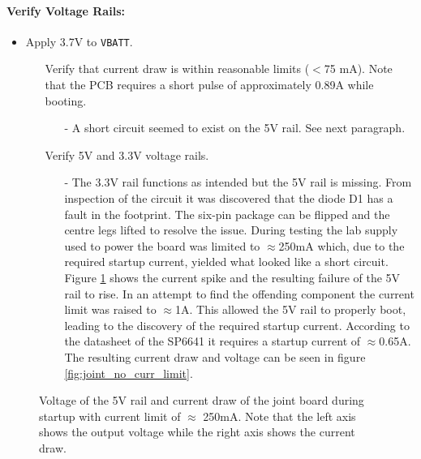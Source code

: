 \paragraph{Verify Voltage Rails:} %
 \label{par:verify_voltage_rails}
 \begin{itemize}
 	\item Apply 3.7V to \texttt{VBATT}.
 	\begin{itemize}
 		\item[\xmark] Verify that current draw is within reasonable limits ($<$75 mA). Note that the PCB requires a short pulse of approximately 0.89A while booting.
 		\begin{itemize}
 			\item[-] A short circuit seemed to exist on the 5V rail.
 			See next paragraph.
 		\end{itemize}
 		\item[\xmark] Verify 5V and 3.3V voltage rails.
 		\begin{itemize}
 			\item[-] The 3.3V rail functions as intended but the 5V rail is missing.
 			From inspection of the circuit it was discovered that the diode D1 has a fault in the footprint.
 			The six-pin package can be flipped and the centre legs lifted to resolve the issue.
 			During testing the lab supply used to power the board was limited to $\approx$250mA which, due to the required startup current, yielded what looked like a short circuit.
 			Figure \ref{fig:joint_curr_limit} shows the current spike and the resulting failure of the 5V rail to rise.
 			In an attempt to find the offending component the current limit was raised to $\approx$1A.
 			This allowed the 5V rail to properly boot, leading to the discovery of the required startup current.
 			According to the datasheet of the SP6641 \cite{sp6641b} it requires a startup current of $\approx$0.65A. 
 			The resulting current draw and voltage can be seen in figure \ref{fig:joint_no_curr_limit}.
 		\end{itemize}
 	\end{itemize}
 \end{itemize}
 
\begin{figure}[h]
	\centering
	\caption[Voltages and current of 5V converter with current limit]{Voltage of the 5V rail and current draw of the joint board during startup with current limit of $\approx$ 250mA. Note that the left axis shows the output voltage while the right axis shows the current draw.}
	\label{fig:joint_curr_limit}
\end{figure}

